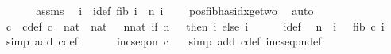 \begin{isabellebody}
%
\isadelimproof
%
\endisadelimproof
%
\isatagproof
{}\isamarkupfalse%
\ {\isacharminus}{\kern0pt}\ \isanewline
\ \ \isamarkupfalse%
\ assms\ \isamarkupfalse%
\ i\ \ i{\isacharunderscore}{\kern0pt}def{\isacharcolon}{\kern0pt}\ {\isachardoublequoteopen}fib\ i\ {\isacharequal}{\kern0pt}\ n{\isachardoublequoteclose}\ {\isachardoublequoteopen}i\ {\isasymge}\ {}{\isachardoublequoteclose}\ \isamarkupfalse%
\ pos{\isacharunderscore}{\kern0pt}fib{\isacharunderscore}{\kern0pt}has{\isacharunderscore}{\kern0pt}idx{\isacharunderscore}{\kern0pt}ge{\isacharunderscore}{\kern0pt}two\ \isamarkupfalse%
\ auto\isanewline
\ \ \isamarkupfalse%
\ c\ \ c{\isacharunderscore}{\kern0pt}def{\isacharcolon}{\kern0pt}\ {\isachardoublequoteopen}{\isacharparenleft}{\kern0pt}c\ {\isacharcolon}{\kern0pt}{\isacharcolon}{\kern0pt}\ nat\ {\isasymRightarrow}\ nat{\isacharparenright}{\kern0pt}\ {\isacharequal}{\kern0pt}\ {\isacharparenleft}{\kern0pt}{\isasymlambda}\ n{\isacharcolon}{\kern0pt}{\isacharcolon}{\kern0pt}nat{\isachardot}{\kern0pt}\ if\ n\ {\isacharequal}{\kern0pt}\ {}\ then\ i\ else\ i\ {\isacharplus}{\kern0pt}\ {}{\isacharparenright}{\kern0pt}{\isachardoublequoteclose}\isanewline
\ \ \isamarkupfalse%
\ i{\isacharunderscore}{\kern0pt}def\ \isamarkupfalse%
\ {\isachardoublequoteopen}n\ {\isacharequal}{\kern0pt}\ {\isacharparenleft}{\kern0pt}{\isasymSum}i\ {\isacharequal}{\kern0pt}\ {}{\isachardot}{\kern0pt}{\isachardot}{\kern0pt}{}{\isachardot}{\kern0pt}\ fib\ {\isacharparenleft}{\kern0pt}c\ i{\isacharparenright}{\kern0pt}{\isacharparenright}{\kern0pt}{\isachardoublequoteclose}\ \isamarkupfalse%
\ {\isacharparenleft}{\kern0pt}simp\ add{\isacharcolon}{\kern0pt}\ c{\isacharunderscore}{\kern0pt}def{\isacharparenright}{\kern0pt}\ \isanewline
\ \ \isamarkupfalse%
\ \isamarkupfalse%
\ {\isachardoublequoteopen}inc{\isacharunderscore}{\kern0pt}seq{\isacharunderscore}{\kern0pt}on\ c\ {\isacharbraceleft}{\kern0pt}{}{\isachardot}{\kern0pt}{\isachardot}{\kern0pt}{}{\isacharbraceright}{\kern0pt}{\isachardoublequoteclose}\ \isamarkupfalse%
\ {\isacharparenleft}{\kern0pt}simp\ add{\isacharcolon}{\kern0pt}\ c{\isacharunderscore}{\kern0pt}def\ inc{\isacharunderscore}{\kern0pt}seq{\isacharunderscore}{\kern0pt}on{\isacharunderscore}{\kern0pt}def{\isacharparenright}{\kern0pt}\isanewline

\end{isabellebody}
